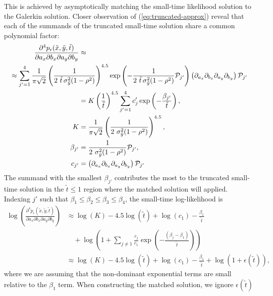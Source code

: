This is achieved by asymptotically matching the small-time likelihood
solution to the Galerkin solution. Closer observation of
(\ref{eq:truncated-approx}) reveal that each of the summands of the
truncated small-time solution share a common polynomial factor:
\begin{align*}
  \frac{\partial^4 p_\epsilon(\tilde{x}, \tilde{y}, \tilde{t})}{\partial a_x
  \partial b_x \partial a_y \partial b_y} &\approx \\
  \MoveEqLeft[10] \approx \sum_{j' = 1}^{4} \frac{1}{\pi\sqrt{2}} \left(\frac{1}{2\,\,\tilde{t}\, \sigma_{\tilde{y}}^2 (1-\rho^2)} \right)^{4.5}
  \exp\left( -\frac{1}{2\,\,\tilde{t}\, \sigma_{\tilde{y}}^2 (1-\rho^2)} \mathcal{P}_{j'}\right)
  \left(\partial_{a_x}\partial_{b_x} \partial_{a_y}\partial_{b_y} \right)\mathcal{P}_{j'} \\
                                          &= K \left(\frac{1}{\tilde{t}} \right)^{4.5} \sum_{j'=1}^4 c_j' \exp\left( -\frac{\beta_{j'}}{\tilde{t}} \right), \\
  K &= \frac{1}{\pi\sqrt{2}} \left(\frac{1}{2\,\, \sigma_{\tilde{y}}^2 (1-\rho^2)} \right)^{4.5}, \\
  \beta_{j'} &= \frac{1}{2\,\, \sigma_{\tilde{y}}^2 (1-\rho^2)} \mathcal{P}_{j'}, \\
  c_{j'} &= \left(\partial_{a_x}\partial_{b_x} \partial_{a_y}\partial_{b_y} \right)\mathcal{P}_{j'}
\end{align*}
The summand with the smallest $\beta_{j'}$ contributes the most to the
truncated small-time solution in the $\tilde{t} \leq 1$ region where
the matched solution will applied. Indexing $j'$ such that
$\beta_1 \leq \beta_2 \leq \beta_3 \leq \beta_4$, the small-time
log-likelihood is
\begin{align}
  \log\left( \frac{\partial^4 p_\epsilon(\tilde{x}, \tilde{y}, \tilde{t})}{\partial a_x
  \partial b_x \partial a_y \partial b_y} \right) &\approx \log(K) - 4.5\log(\tilde{t}) + \log(c_1) - \frac{\beta_1}{\tilde{t}} \nonumber \\
  &\quad + \log\left(1 + \sum_{j \neq 1} \frac{c_j}{c_1}\exp\left( -\frac{(\beta_j-\beta_1)}{\tilde{t}} \right) \right) \nonumber \\
  &\approx \log(K) - 4.5\log(\tilde{t}) + \log(c_1) - \frac{\beta_1}{\tilde{t}} + \log\left(1 + \epsilon(\tilde{t}) \right), \label{eq:small-time-log-like}
\end{align}
where we are assuming that the non-dominant exponential terms are
small relative to the $\beta_1$ term. When
constructing the matched solution, we ignore $\epsilon(\tilde{t})$
